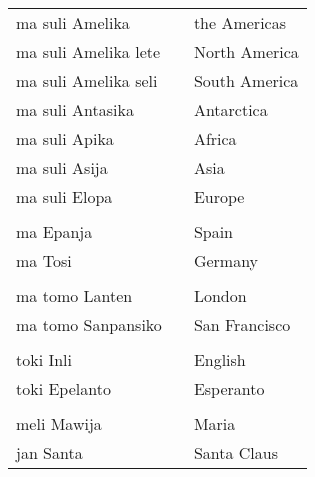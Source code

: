 \begin{supertabular}{p{2,5cm}|ll}
    ma suli Amelika      &  & the Americas  \\
    ma suli Amelika lete &  & North America \\
    ma suli Amelika seli &  & South America \\
    ma suli Antasika     &  & Antarctica    \\
    ma suli Apika        &  & Africa        \\
    ma suli Asija        &  & Asia          \\
    ma suli Elopa        &  & Europe        \\
                         &  &               \\ %
    ma Epanja            &  & Spain         \\
    ma Tosi              &  & Germany       \\
                         &  &               \\ %
    ma tomo Lanten       &  & London        \\
    ma tomo Sanpansiko   &  & San Francisco \\
                         &  &               \\ %
    toki Inli            &  & English       \\
    toki Epelanto        &  & Esperanto     \\
                         &  &               \\ %
    meli Mawija          &  & Maria         \\
    jan Santa            &  & Santa Claus   \\
\end{supertabular}
%
%
\newpage
%
